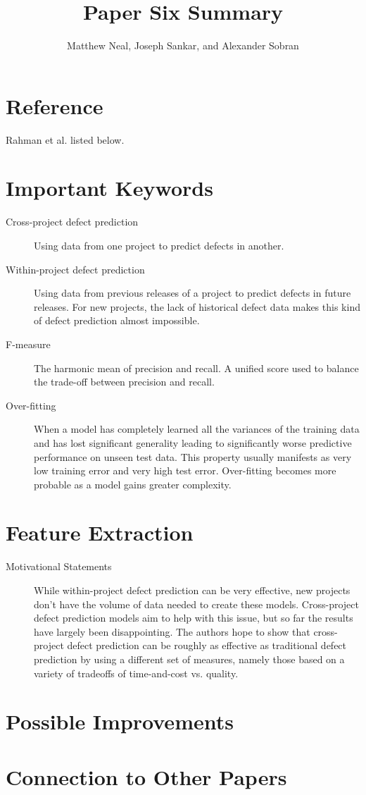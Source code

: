 \documentclass[english]{article}
\begin{document}
\title{Paper Six Summary}


\author{Matthew Neal, Joseph Sankar, and Alexander Sobran}

\maketitle

\section*{Reference}

Rahman et al. \cite{Rahman} listed below.


\section*{Important Keywords}
\begin{description}
\item [{Cross-project defect prediction}] Using data from one project to predict defects in another.
\item [{Within-project defect prediction}] Using data from previous releases of a project to predict defects in future releases. For new projects, the lack of historical defect data makes this kind of defect prediction almost impossible.
\item[{F-measure}] The harmonic mean of precision and recall. A unified score used to balance the trade-off between precision and recall.
\item[{Over-fitting}] When a model has completely learned all the variances of the training data and has lost significant generality leading to significantly worse predictive performance on unseen test data. This property usually manifests as very low training error and very high test error. Over-fitting becomes more probable as a model gains greater complexity.

\end{description}

\section*{Feature Extraction}
\begin{description}
\item[{Motivational Statements}]  While within-project defect prediction can be very effective, new projects don't have the volume of data needed to create these models. Cross-project defect prediction models aim to help with this issue, but so far the results have largely been disappointing. The authors hope to show that cross-project defect prediction can be roughly as effective as traditional defect prediction by using a different set of measures, namely those based on a variety of tradeoffs of time-and-cost vs. quality.

\end{description}


\section*{Possible Improvements}

\section*{Connection to Other Papers}



\end{document}
